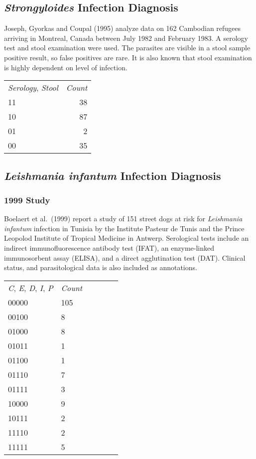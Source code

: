 \subsection{{\it Strongyloides} Infection Diagnosis}

Joseph, Gyorkas and Coupal (1995) analyze data on 162 Cambodian
refugees arriving in Montreal, Canada between July 1982 and February
1983.  A serology test and stool examination were used.  The parasites
are visible in a stool sample positive result, so false positives are
rare.  It is also known that stool examination is highly dependent
on level of infection.

\begin{tabular}{lr}
{\it Serology}, {\it Stool} & {\it Count} \\
11 & 38 \\
10 & 87 \\
01 & 2 \\
00 & 35 \\
\end{tabular}

\subsection{{\it Leishmania infantum} Infection Diagnosis}

\subsubsection{1999 Study}

Boelaert et al.~(1999) report a study of 151 street dogs at risk for
{\it Leishmania infantum} infection in Tunisia by the Institute Pasteur de
Tunis and the Prince Leopolod Institute of Tropical Medicine in
Antwerp.  Serological tests include an indirect immunofluorescence
antibody test (IFAT), an enzyme-linked immunosorbent assay (ELISA),
and a direct agglutination test (DAT).  Clinical status, and parasitological
data is also included as annotations.

\begin{tabular}{lllllr}
{\it C}, {\it E}, {\it D}, {\it I}, {\it P} & {\it Count} \\
00000 & 105 \\
00100 & 8 \\
01000 & 8 \\
01011 & 1 \\
01100 & 1 \\
01110 & 7 \\
01111 & 3 \\
10000 & 9 \\
10111 & 2 \\
11110 & 2 \\
11111 & 5 \\
\end{tabular}

